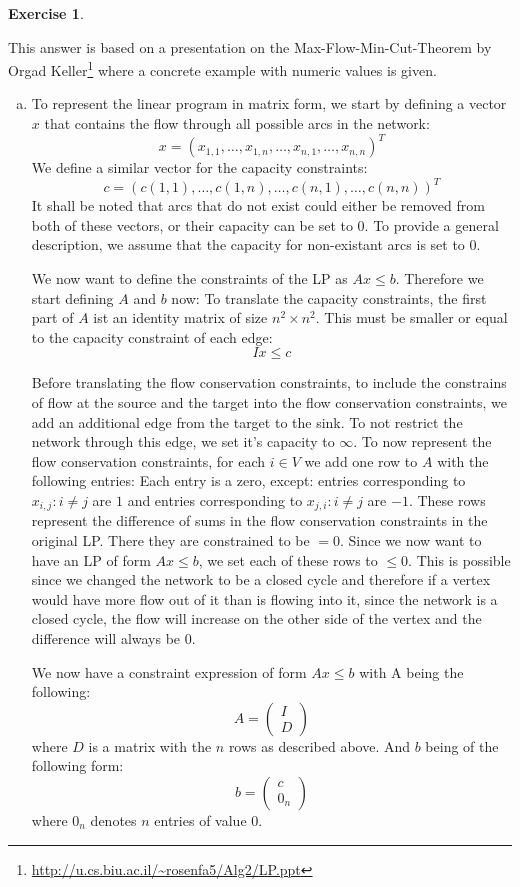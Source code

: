\documentclass[a4paper,12pt,headsepline]{scrartcl}
\newtheorem{aufgabe}{Exercise}
\begin{document}
\begin{aufgabe}
\end{aufgabe}
This answer is based on a presentation on the Max-Flow-Min-Cut-Theorem by Orgad Keller\footnote{\url{http://u.cs.biu.ac.il/~rosenfa5/Alg2/LP.ppt}} where a concrete example with numeric values is given.
\begin{enumerate}[a)]
  \item\label{sec:3a}To represent the linear program in matrix form, we start by defining a vector $x$ that contains the flow through all possible arcs in the network:
    \[ x = (x_{1,1},\dots,x_{1,n},\dots,x_{n,1},\dots,x_{n,n})^T \]
    We define a similar vector for the capacity constraints:
    \[ c = (c(1,1),\dots,c(1,n),\dots,c(n,1),\dots,c(n,n))^T \]
    It shall be noted that arcs that do not exist could either be removed from both of these vectors, or their capacity can be set to 0.
    To provide a general description, we assume that the capacity for non-existant arcs is set to 0.
    
    We now want to define the constraints of the LP as $Ax\le b$.
    Therefore we start defining $A$ and $b$ now:
    To translate the capacity constraints, the first part of $A$ ist an identity matrix of size $n^2\times n^2$.
    This must be smaller or equal to the capacity constraint of each edge:
    \[ Ix\le c \]
    
    Before translating the flow conservation constraints, to include the constrains of flow at the source and the target into the flow conservation constraints, we add an additional edge from the target to the sink.
    To not restrict the network through this edge, we set it's capacity to $\infty$.
    To now represent the flow conservation constraints, for each $i\in V$ we add one row to $A$ with the following entries:
    Each entry is a zero, except: entries corresponding to $x_{i,j}:i\ne j$ are $1$ and entries corresponding to $x_{j,i}:i\ne j$ are $-1$.
    These rows represent the difference of sums in the flow conservation constraints in the original LP.
    There they are constrained to be $=0$.
    Since we now want to have an LP of form $Ax\le b$, we set each of these rows to $\le 0$.
    This is possible since we changed the network to be a closed cycle and therefore if a vertex would have more flow out of it than is flowing into it, since the network is a closed cycle, the flow will increase on the other side of the vertex and the difference will always be 0.

    We now have a constraint expression of form $Ax\le b$ with A being the following:
    \[ A=\begin{pmatrix}I\\D\end{pmatrix} \]
    where $D$ is a matrix with the $n$ rows as described above.
    And $b$ being of the following form:
    \[ b=\begin{pmatrix}c\\0_n\end{pmatrix} \]
    where $0_n$ denotes $n$ entries of value $0$.
    

\end{enumerate}
\end{document}
